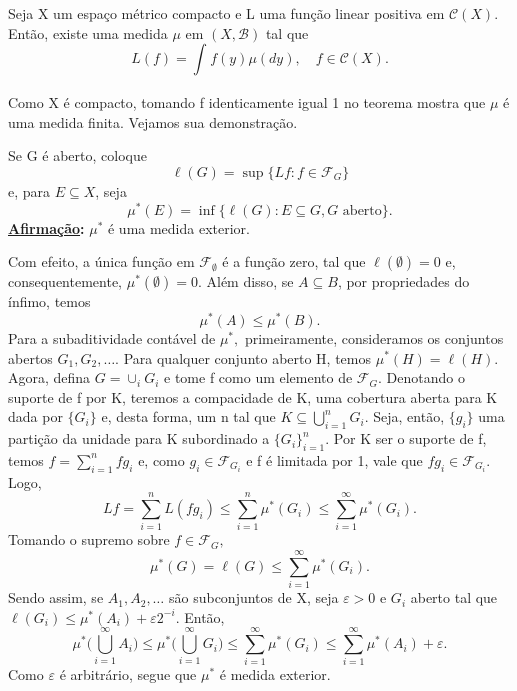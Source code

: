 \documentclass[measure_theory.tex]{subfiles}
\begin{document}
\hypertarget{riesz_representation}{
	\begin{theorem*}
		Seja X um espaço métrico compacto e L uma função linear positiva em \(\mathcal{C}(X).\) Então, existe uma medida \(\mu \) em \((X, \mathcal{B})\) tal que
		\[
			L(f) = \int_{}^{}f(y)\mu (dy),\quad f\in \mathcal{C}(X).
		\]
	\end{theorem*}}
Como X é compacto, tomando f identicamente igual 1 no teorema mostra que \(\mu \) é uma medida finita. Vejamos sua demonstração.
\begin{proof*}
	Se G é aberto, coloque
	\[
		\ell (G) = \sup_{}\{Lf: f\in \mathcal{F}_{G}\}
	\]
	e, para \(E\subseteq X\), seja
	\[
		\mu ^{*}(E) = \inf_{}\{\ell (G): E\subseteq G, G \text{ aberto}\}.
	\]
	\textbf{\underline{Afirmação}:} \(\mu ^{*}\) é uma medida exterior.

	Com efeito, a única função em \(\mathcal{F}_{\emptyset }\) é a função zero, tal que \(\ell (\emptyset ) = 0\) e, consequentemente, \(\mu ^{*}(\emptyset ) = 0\). Além disso, se \(A\subseteq B\), por propriedades do ínfimo, temos
	\[
		\mu ^{*}(A) \leq \mu ^{*}(B).
	\]
	Para a subaditividade contável de \(\mu ^{*},\) primeiramente, consideramos os conjuntos abertos \(G_1, G_2, \dotsc \). Para qualquer conjunto aberto H, temos \(\mu ^{*}(H) = \ell (H).\) Agora, defina
	\(G = \cup_{i}G_{i}\) e tome f como um elemento de \(\mathcal{F}_{G}.\) Denotando o suporte de f por K, teremos a compacidade de K, uma cobertura aberta para K dada por \(\{G_{i}\}\) e, desta forma, um n tal que \(K \subseteq \bigcup_{i=1}^{n}G_{i}.\)
	Seja, então, \(\{g_{i}\}\) uma partição da unidade para K subordinado a \(\{G_{i}\}_{i=1}^{n}.\) Por K ser o suporte de f, temos \(f = \sum\limits_{i=1}^{n}fg_{i}\) e, como \(g_{i}\in \mathcal{F}_{G_{i}}\) e f é limitada por 1, vale que \(fg_{i}\in \mathcal{F}_{G_{i}}.\) Logo,
	\[
		Lf = \sum\limits_{i=1}^{n}L(fg_{i}) \leq \sum\limits_{i=1}^{n}\mu ^{*}(G_{i})\leq \sum\limits_{i=1}^{\infty}\mu^{*}(G_{i}).
	\]
	Tomando o supremo sobre \(f\in \mathcal{F}_{G},\)
	\[
		\mu ^{*}(G) = \ell (G) \leq \sum\limits_{i=1}^{\infty}\mu^{*}(G_{i}).
	\]
	Sendo assim, se \(A_1, A_2, \dotsc \) são subconjuntos de X, seja \(\varepsilon > 0\) e \(G_{i}\) aberto tal que \(\ell (G_{i})\leq \mu ^{*}(A_{i}) + \varepsilon 2^{-i}.\) Então,
	\[
		\mu ^{*}\biggl(\bigcup_{i=1}^{\infty}A_{i}\biggr) \leq \mu ^{*}\biggl(\bigcup_{i=1}^{\infty}G_{i}\biggr) \leq \sum\limits_{i=1}^{\infty}\mu ^{*}(G_{i}) \leq \sum\limits_{i=1}^{\infty}\mu ^{*}(A_{i}) + \varepsilon .
	\]
	Como \(\varepsilon \) é arbitrário, segue que \(\mu ^{*}\) é medida exterior.


\end{proof*}
\end{document}
